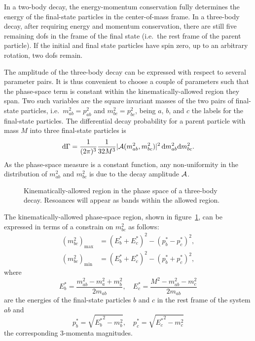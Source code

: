 In a two-body decay, the energy-momentum conservation fully determines the energy of the final-state particles in the center-of-mass frame.
In a three-body decay, after requiring energy and momentum conservation, there are still five remaining \acp{dof} in the frame of the final state (i.e.~the rest frame of the parent particle).
If the initial and final state particles have spin zero, up to an arbitrary rotation, two \acp{dof} remain.


The amplitude of the three-body decay can be expressed with respect to several parameter pairs.
It is thus convenient to choose a couple of parameters such that the phase-space term is constant within the kinematically-allowed region they span.
Two such variables are the square invariant masses of the two pairs of final-state particles, i.e.~$m_{ab}^2 = p_{ab}^2$ and $m_{bc}^2 = p_{bc}^2$, being $a$, $b$, and $c$ the labels for the final-state particles.
The differential decay probability for a parent particle with mass $M$ into three final-state particles is
\begin{equation}
    \mathop{}\!\textup{d}\Gamma = \frac{1}{(2\pi)^3}\frac{1}{32M^3}\lvert\mathcal{A}(m_{ab}^2, m_{bc}^2)\rvert^2
    \mathop{}\!\textup{d} m_{ab}^2 \!\mathop{}\!\textup{d} m_{bc}^2.
\end{equation}
As the phase-space measure is a constant function, any non-uniformity in the distribution of $m_{ab}^2$ and $m_{bc}^2$ is due to the decay amplitude $\mathcal{A}$.

\begin{figure}
    \centering
    
    \caption{Kinematically-allowed region in the phase space of a three-body decay. Resoances will appear as bands within the allowed region.}
    \label{fig:dalitz_kinematically_allowed}
\end{figure}
The kinematically-allowed phase-space region, shown in figure~\ref{fig:dalitz_kinematically_allowed}, can be expressed in terms of a constrain on $m_{bc}^2$ as follows:
\begin{equation}
\begin{aligned}
    (m_{bc}^2)_{\text{max}} &= (E_b^* + E_c^*)^2 - (p_b^* - p_c^*)^2,\\
    (m_{bc}^2)_{\text{min}} &= (E_b^* + E_c^*)^2 - (p_b^* + p_c^*)^2,
\end{aligned}
\end{equation}
where
\begin{equation}
    E_b^* = \frac{m_{ab}^2 - m_a^2 + m_b^2}{2m_{ab}},\quad%
    E_c^* = \frac{M^2 - m_{ab}^2 - m_c^2}{2 m_{ab}}
\end{equation}
are the energies of the final-state particles $b$ and $c$ in the rest frame of the system $ab$ and
\begin{equation}
    p_b^* = \sqrt{{E_b^*}^2 - m_b^2},\quad%
    p_c^* = \sqrt{{E_c^*}^2 - m_c^2}
\end{equation}
the corresponding 3-momenta magnitudes.
